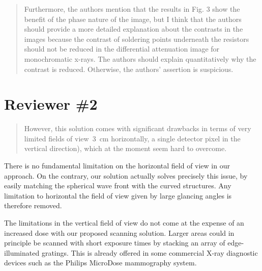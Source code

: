 \documentclass[a4paper]{scrartcl}
\begin{document}
\begin{quote}
    Furthermore, the authors mention that the results in Fig. 3 show the benefit of the phase nature of the image, but I think that the authors should provide a more detailed explanation about the contrasts in the images because the contrast of soldering points underneath the resistors should not be reduced in the differential attenuation image for monochromatic x-rays. The authors should explain quantitatively why the contrast is reduced. Otherwise, the authors' assertion is suspicious.
\end{quote}

\section*{Reviewer \#2}
\begin{quote}
    However, this solution comes with significant drawbacks in terms of very
    limited fields of view~\SI{3}{\centi\metre} horizontally, a single detector pixel in the vertical direction), which at the moment seem hard to overcome.
\end{quote}
There is no fundamental limitation on the horizontal field of view in our
approach. On the contrary, our solution actually solves precisely this
issue, by easily matching the spherical wave front with the curved
structures. Any limitation to horizontal the field of view given by large glancing
angles is therefore removed.

The limitations in the vertical field of view do not come at the expense of
an increased dose with our proposed scanning solution. Larger areas could in
principle be scanned with short exposure times by stacking an array of
edge-illuminated gratings. This is already offered in some commercial X-ray
diagnostic devices such as the Philips MicroDose mammography system.
\end{document}
